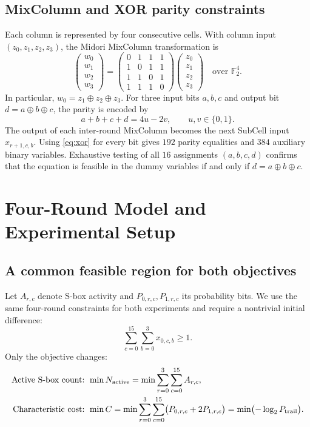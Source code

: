 \documentclass[11pt,a4paper]{article}
\begin{document}
\subsection{MixColumn and XOR parity constraints}
Each column is represented by four consecutive cells. With column input
$(z_0,z_1,z_2,z_3)$, the Midori MixColumn transformation is
\begin{equation}\label{eq:mix}
\begin{pmatrix}w_0\\w_1\\w_2\\w_3\end{pmatrix}=
\begin{pmatrix}
0&1&1&1\\1&0&1&1\\1&1&0&1\\1&1&1&0
\end{pmatrix}
\begin{pmatrix}z_0\\z_1\\z_2\\z_3\end{pmatrix}
\quad\text{over }\mathbb F_2^4.
\end{equation}
In particular, $w_0=z_1\oplus z_2\oplus z_3$. For three input bits
$a,b,c$ and output bit $d=a\oplus b\oplus c$, the parity is encoded by
\begin{equation}\label{eq:xor}
 a+b+c+d=4u-2v,\qquad u,v\in\{0,1\}.
\end{equation}
The output of each inter-round MixColumn becomes the next SubCell input
$x_{r+1,c,b}$. Using \eqref{eq:xor} for every bit gives $192$ parity
equalities and $384$ auxiliary binary variables. Exhaustive testing of
all $16$ assignments $(a,b,c,d)$ confirms that the equation is feasible
in the dummy variables if and only if $d=a\oplus b\oplus c$.

\section{Four-Round Model and Experimental Setup}
\subsection{A common feasible region for both objectives}
Let $A_{r,c}$ denote S-box activity and $P_{0,r,c},P_{1,r,c}$ its probability bits.
We use the same four-round constraints for both experiments and require a
nontrivial initial difference:
\begin{equation}\label{eq:nonzero}
 \sum_{c=0}^{15}\sum_{b=0}^{3} x_{0,c,b}\geq1.
\end{equation}
Only the objective changes:
\begin{align}
 \text{Active S-box count: } &\min N_{\rm active}
 =\min\sum_{r=0}^{3}\sum_{c=0}^{15}A_{r,c},\label{eq:obj-act}\\
 \text{Characteristic cost: } &\min C
 =\min\sum_{r=0}^{3}\sum_{c=0}^{15}
 \bigl(P_{0,r,c}+2P_{1,r,c}\bigr)
 =\min\bigl(-\log_2P_{\rm trail}\bigr).\label{eq:obj-prob}
\end{align}
\end{document}
